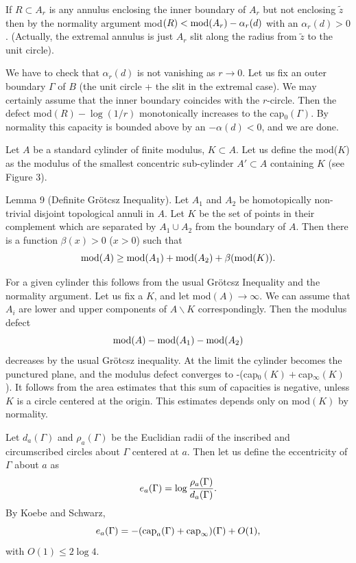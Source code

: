 If $R\subset A_r$  is any annulus enclosing the inner boundary of $A_r$
but not enclosing $\tilde z$ then by the normality argument
mod$(R)<{\rm mod}(A_r)-	\alpha_r(d)$ with an $\alpha_r(d)>0$.
(Actually, the extremal annulus is just $A_r$ slit along the radius from
$\tilde z$ to the unit circle).

We have to check that $\alpha_r(d)$ is not vanishing as $r\to 0$.
Let us fix an outer boundary $\Gamma$ of $B$ (the unit circle + the slit 
in the extremal case). We may certainly
assume that the inner boundary coincides with the $r$-circle.
Then the defect mod$(R)-\log(1/r)$ monotonically increases to the
 cap$_0(\Gamma)$. By normality this capacity is   bounded above
 by an $-\alpha(d)<0$, and we are done.      \QED

Let $A$ be a standard cylinder of finite modulus, $K\subset A$. Let us define
the  mod($K$) as the modulus of the smallest concentric sub-cylinder 
$A'\subset A$ containing $K$ (see Figure 3).

\proclaim Lemma 9 (Definite Gr\"{o}tcsz Inequality). Let $A_1$ and $A_2$
be homotopically non-trivial disjoint topological annuli in $A$.
Let $K$ be the set of points in their complement which are separated 
by $A_1\cup A_2$ from
the boundary of $A$. Then there is a function $\beta(x)>0$
($x>0$) such that
$${\rm mod }(A)\geq {\rm mod}(A_1)+{\rm mod}(A_2)+\beta({\rm mod}(K)).$$

 For a given cylinder this follows from the
usual Gr\"{o}tcsz Inequality and the normality argument. 
Let us fix a $K$, and let  mod$(A)\to\infty$. We can assume that $A_i$
are lower and upper components of $A\backslash K$ correspondingly.
Then the modulus defect
$${\rm mod }(A)-{\rm mod}(A_1)-{\rm mod}(A_2)$$
 decreases by the usual Gr\"{o}tcsz inequality. At the limit the cylinder
becomes the punctured plane, and the modulus defect converges to
-(cap$_0(K)+$cap$_{\infty}(K)$). It follows from the area estimates that
this sum of capacities is negative, unless $K$ is a circle centered at the
origin. This estimates depends only on mod$(K)$ by normality.  \QED

Let $d_a(\Gamma)$ and $\rho_a(\Gamma)$ be the Euclidian radii of the 
inscribed and circumscribed circles about  $\Gamma$ 
centered at $a$. Then let us define the eccentricity of $\Gamma$ about $a$ as
$$e_a(\Gamma)=\log{\rho_a(\Gamma)\over d_a(\Gamma)}.$$ By Koebe and
Schwarz,
$$e_a(\Gamma)=-({\rm cap}_a(\Gamma)+{\rm cap}_{\infty})(\Gamma)+O(1),$$ 
with $O(1)\leq 2\log4$.

